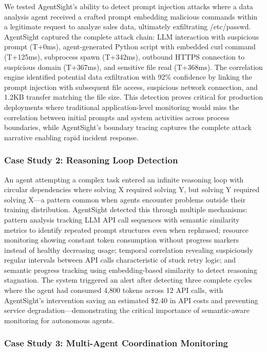 We tested AgentSight's ability to detect prompt injection attacks where a data analysis agent received a crafted prompt embedding malicious commands within a legitimate request to analyze sales data, ultimately exfiltrating /etc/passwd. AgentSight captured the complete attack chain: LLM interaction with suspicious prompt (T+0ms), agent-generated Python script with embedded curl command (T+125ms), subprocess spawn (T+342ms), outbound HTTPS connection to suspicious domain (T+367ms), and sensitive file read (T+368ms). The correlation engine identified potential data exfiltration with 92\% confidence by linking the prompt injection with subsequent file access, suspicious network connection, and 1.2KB transfer matching the file size. This detection proves critical for production deployments where traditional application-level monitoring would miss the correlation between initial prompts and system activities across process boundaries, while AgentSight's boundary tracing captures the complete attack narrative enabling rapid incident response.

\subsubsection{Case Study 2: Reasoning Loop Detection}

An agent attempting a complex task entered an infinite reasoning loop with circular dependencies where solving X required solving Y, but solving Y required solving X—a pattern common when agents encounter problems outside their training distribution. AgentSight detected this through multiple mechanisms: pattern analysis tracking LLM API call sequences with semantic similarity metrics to identify repeated prompt structures even when rephrased; resource monitoring showing constant token consumption without progress markers instead of healthy decreasing usage; temporal correlation revealing suspiciously regular intervals between API calls characteristic of stuck retry logic; and semantic progress tracking using embedding-based similarity to detect reasoning stagnation. The system triggered an alert after detecting three complete cycles where the agent had consumed 4,800 tokens across 12 API calls, with AgentSight's intervention saving an estimated \$2.40 in API costs and preventing service degradation—demonstrating the critical importance of semantic-aware monitoring for autonomous agents.

\subsubsection{Case Study 3: Multi-Agent Coordination Monitoring}

